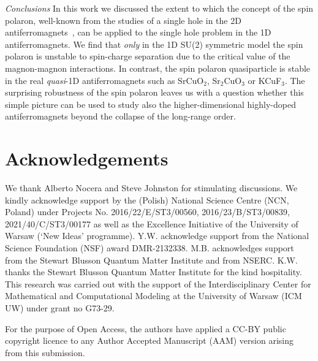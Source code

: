 \documentclass[%
 reprint,
 amsmath,amssymb,
 aps,
prl,
]{revtex4-1}
\begin{document}
{\it Conclusions}
In this work we discussed the extent to which the concept of the spin polaron, well-known from the studies of a single hole in the 2D antiferromagnets~\cite{Shr88}, can be applied to the single hole problem in the 1D antiferromagnets. We find that {\it only} in the 1D SU(2) symmetric model the spin polaron is unstable to spin-charge separation due to the critical value of the magnon-magnon interactions. In contrast, the spin polaron quasiparticle is stable in the real {\it quasi}-1D antiferromagnets such as SrCuO$_2$, Sr$_2$CuO$_3$ or KCuF$_3$.
The surprising robustness of the spin polaron leaves us with a question whether this simple picture can be used to study also the higher-dimensional highly-doped antiferromagnets beyond the collapse of the long-range order.

\section*{Acknowledgements}
We thank Alberto Nocera and Steve Johnston for stimulating discussions.
We  kindly  acknowledge  support  by  the  (Polish)  National  Science  Centre  (NCN, Poland)  under  Projects  No. 2016/22/E/ST3/00560, 2016/23/B/ST3/00839, 2021/40/C/ST3/00177 as well as the Excellence Initiative of the University of Warsaw (`New Ideas' programme).
Y.W. acknowledge support from the National Science Foundation (NSF) award DMR-2132338.
M.B. acknowledges support from the Stewart Blusson Quantum Matter Institute and from NSERC. 
K.W. thanks the Stewart Blusson Quantum Matter Institute for the kind hospitality.
This research was carried out with the support of the Interdisciplinary Center for Mathematical and Computational Modeling at the University of Warsaw (ICM UW) under grant no G73-29.


For the purpose of Open Access, the authors have applied a CC-BY public copyright licence to any
Author Accepted Manuscript (AAM) version arising from this submission.




\end{document}
